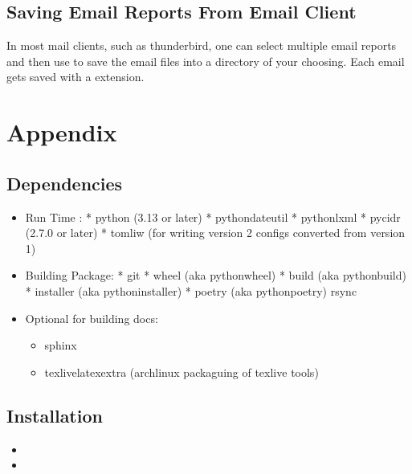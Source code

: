 \documentclass[letterpaper,10pt,english]{sphinxmanual}
\begin{document}
\section{Saving Email Reports From Email Client}
\label{\detokenize{README:saving-email-reports-from-email-client}}
\sphinxAtStartPar
In most mail clients, such as thunderbird,  one can select multiple email reports and
then use  to save the email files into a directory of your choosing.
Each email gets saved with a  extension.


\chapter{Appendix}
\label{\detokenize{README:appendix}}

\section{Dependencies}
\label{\detokenize{README:dependencies}}\begin{itemize}
\item {} 
\sphinxAtStartPar
Run Time :
* python (3.13 or later)
* python\sphinxhyphen{}dateutil
* python\sphinxhyphen{}lxml
* py\sphinxhyphen{}cidr (2.7.0 or later)
* tomli\sphinxhyphen{}w (for writing version 2 configs converted from version 1)

\item {} 
\sphinxAtStartPar
Building Package:
* git
* wheel (aka python\sphinxhyphen{}wheel)
* build (aka python\sphinxhyphen{}build)
* installer (aka python\sphinxhyphen{}installer)
* poetry (aka python\sphinxhyphen{}poetry)
\sphinxhyphen{} rsync

\item {} 
\sphinxAtStartPar
Optional for building docs:
\begin{itemize}
\item {} 
\sphinxAtStartPar
sphinx

\item {} 
\sphinxAtStartPar
texlive\sphinxhyphen{}latexextra  (archlinux packaguing of texlive tools)

\end{itemize}

\end{itemize}


\section{Installation}
\label{\detokenize{README:installation}}\begin{description}
\begin{itemize}
\item {} 
\sphinxAtStartPar
{}

\item {} 
\sphinxAtStartPar
{}

\end{itemize}

\end{description}
\end{document}
